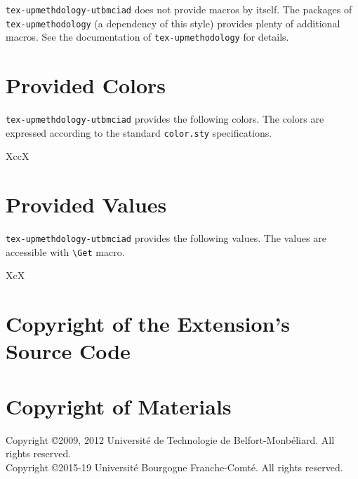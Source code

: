 \documentclass[article]{upmethodology-document}
\gdef\upmextensiondoccolorlist{}
\gdef\upmextensiondocvaluelist{}
\begin{document}
\texttt{tex-upmethdology-utbmciad} does not provide macros by itself. The packages of \texttt{tex-upmethodology} (a dependency of this style) provides plenty of additional macros. See the documentation of \texttt{tex-upmethodology} for details.

\section{Provided Colors}

\texttt{tex-upmethdology-utbmciad} provides the following colors. The colors are expressed according to the standard \texttt{color.sty} specifications.

\begin{mtabular}{4}{XccX}
\upmextensiondoccolorlist
\end{mtabular}

\section{Provided Values}

\texttt{tex-upmethdology-utbmciad} provides the following values. The values are accessible with \texttt{{\textbackslash}Get} macro.

\begin{tiny}
\begin{mtabular}{3}{XcX}
\upmextensiondocvaluelist
\end{mtabular}
\end{tiny}

\section{Copyright of the Extension's Source Code}



\section{Copyright of Materials}

Copyright \copyright 2009, 2012 Universit\'e de Technologie de Belfort-Monb\'eliard. All rights reserved. \\
Copyright \copyright 2015-19 Universit\'e Bourgogne Franche-Comt\'e. All rights reserved.
\end{document}
